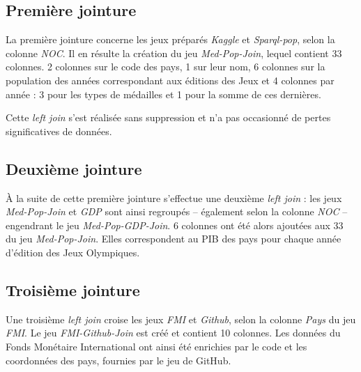 \documentclass[hidelinks, 12pt]{report}
\begin{document}
%





\label{join}\subsection{Première jointure}

La première jointure concerne les jeux préparés \textit{Kaggle} et \textit{Sparql-pop}, selon la colonne \textit{NOC}. Il en résulte la création du jeu \textit{Med-Pop-Join}, lequel contient 33 colonnes. 2 colonnes sur le code des pays, 1 sur leur nom, 6 colonnes sur la population des années correspondant aux éditions des Jeux et 4 colonnes par année : 3 pour les types de médailles et 1 pour la somme de ces dernières.

Cette \textit{left join} s'est réalisée sans suppression et n'a pas occasionné de pertes significatives de données.





%





\subsection{Deuxième jointure}

À la suite de cette première jointure s'effectue une deuxième \textit{left join} : les jeux \textit{Med-Pop-Join} et \textit{GDP} sont ainsi regroupés -- également selon la colonne \textit{NOC} -- engendrant le jeu \textit{Med-Pop-GDP-Join}. 6 colonnes ont été alors ajoutées aux 33 du jeu \textit{Med-Pop-Join}. Elles correspondent au PIB des pays pour chaque année d'édition des Jeux Olympiques.





%





\subsection{Troisième jointure}

Une troisième \textit{left join} croise les jeux \textit{FMI} et \textit{Github}, selon la colonne \textit{Pays} du jeu \textit{FMI}. Le jeu \textit{FMI-Github-Join} est créé et contient 10 colonnes. Les données du Fonds Monétaire International ont ainsi été enrichies par le code et les coordonnées des pays, fournies par le jeu de GitHub.
\end{document}
